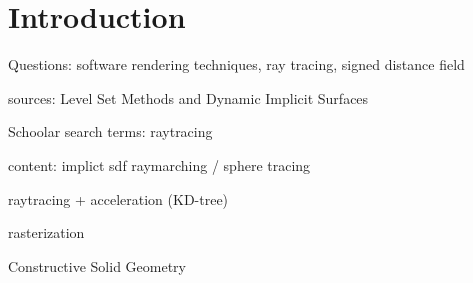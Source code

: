 \section{Introduction}
\label{section:Introduction}

Questions: software rendering techniques, ray tracing, signed distance field

sources: Level Set Methods and Dynamic Implicit Surfaces

Schoolar search terms: 
raytracing


content:
implict
sdf
raymarching / sphere tracing

raytracing + acceleration (KD-tree)

rasterization

Constructive Solid Geometry